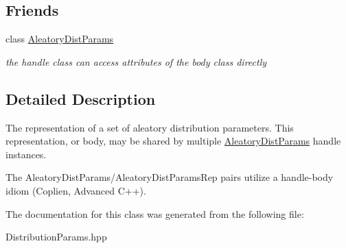 \subsection*{Friends}
\begin{DoxyCompactItemize}
\item 
class \hyperlink{classPecos_1_1AleatoryDistParamsRep_a03d06f735b5fdd8af47563f967c3a2b2}{Aleatory\+Dist\+Params}\label{classPecos_1_1AleatoryDistParamsRep_a03d06f735b5fdd8af47563f967c3a2b2}

\begin{DoxyCompactList}\small\item\em the handle class can access attributes of the body class directly \end{DoxyCompactList}\end{DoxyCompactItemize}


\subsection{Detailed Description}
The representation of a set of aleatory distribution parameters. This representation, or body, may be shared by multiple \hyperlink{classPecos_1_1AleatoryDistParams}{Aleatory\+Dist\+Params} handle instances. 

The Aleatory\+Dist\+Params/\+Aleatory\+Dist\+Params\+Rep pairs utilize a handle-\/body idiom (Coplien, Advanced C++). 

The documentation for this class was generated from the following file\+:\begin{DoxyCompactItemize}
\item 
Distribution\+Params.\+hpp\end{DoxyCompactItemize}
